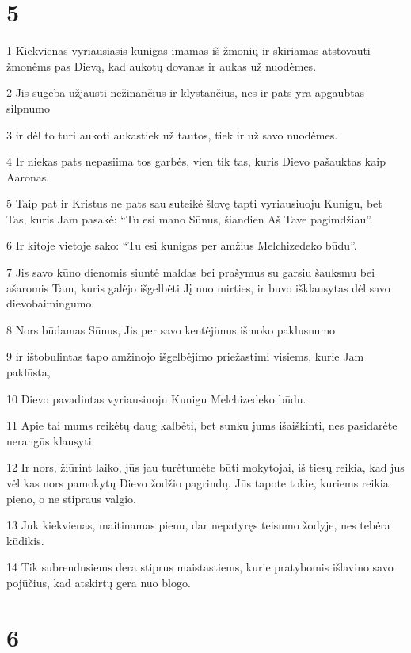 \chapter{5}


\par 1 Kiekvienas vyriausiasis kunigas imamas iš žmonių ir skiriamas atstovauti žmonėms pas Dievą, kad aukotų dovanas ir aukas už nuodėmes. 
\par 2 Jis sugeba užjausti nežinančius ir klystančius, nes ir pats yra apgaubtas silpnumo 
\par 3 ir dėl to turi aukoti aukas­tiek už tautos, tiek ir už savo nuodėmes. 
\par 4 Ir niekas pats nepasiima tos garbės, vien tik tas, kuris Dievo pašauktas kaip Aaronas. 
\par 5 Taip pat ir Kristus ne pats sau suteikė šlovę tapti vyriausiuoju Kunigu, bet Tas, kuris Jam pasakė: “Tu esi mano Sūnus, šiandien Aš Tave pagimdžiau”. 
\par 6 Ir kitoje vietoje sako: “Tu esi kunigas per amžius Melchizedeko būdu”. 
\par 7 Jis savo kūno dienomis siuntė maldas bei prašymus su garsiu šauksmu bei ašaromis Tam, kuris galėjo išgelbėti Jį nuo mirties, ir buvo išklausytas dėl savo dievobaimingumo. 
\par 8 Nors būdamas Sūnus, Jis per savo kentėjimus išmoko paklusnumo 
\par 9 ir ištobulintas tapo amžinojo išgelbėjimo priežastimi visiems, kurie Jam paklūsta, 
\par 10 Dievo pavadintas vyriausiuoju Kunigu Melchizedeko būdu. 
\par 11 Apie tai mums reikėtų daug kalbėti, bet sunku jums išaiškinti, nes pasidarėte nerangūs klausyti. 
\par 12 Ir nors, žiūrint laiko, jūs jau turėtumėte būti mokytojai, iš tiesų reikia, kad jus vėl kas nors pamokytų Dievo žodžio pagrindų. Jūs tapote tokie, kuriems reikia pieno, o ne stipraus valgio. 
\par 13 Juk kiekvienas, maitinamas pienu, dar nepatyręs teisumo žodyje, nes tebėra kūdikis. 
\par 14 Tik subrendusiems dera stiprus maistas­tiems, kurie pratybomis išlavino savo pojūčius, kad atskirtų gera nuo blogo.


\chapter{6}


